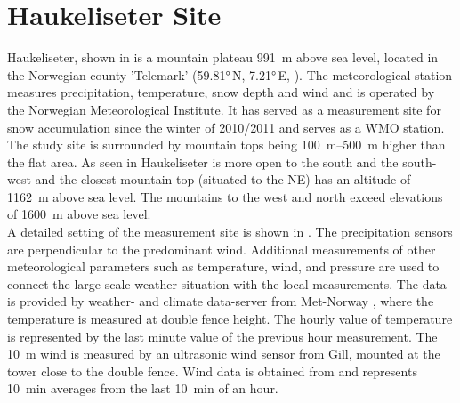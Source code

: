 \section{Haukeliseter Site}\label{sec:dim:site}
Haukeliseter, shown in  is a mountain plateau \SI{991}{\m} above sea level, located in the Norwegian county 'Telemark' (\ang{59.81}\,N, \ang{7.21}\,E, ). The meteorological station measures precipitation, temperature, snow depth and wind and is operated by the Norwegian Meteorological Institute. It has served as a measurement site for snow accumulation since the winter of 2010/2011 \citep{wolff_new_2010} and serves as a WMO station. 
\\

\noindent
The study site is surrounded by mountain tops being \SIrange{100}{500}{\metre} higher than the flat area. As seen in  Haukeliseter is more open to the south and the south-west and the closest mountain top (situated to the NE) has an altitude of \SI{1162}{\metre} above sea level. The mountains to the west and north exceed elevations of \SI{1600}{\metre} above sea level.
\\

\noindent
A detailed setting of the measurement site is shown in . The precipitation sensors are perpendicular to the predominant wind. Additional measurements of other meteorological parameters such as temperature, wind, and pressure are used to connect the large-scale weather situation with the local measurements. The data is provided by weather- and climate data-server from Met-Norway \citep{eklima_norwegian_2016}, where the temperature is measured at double fence height. The hourly value of temperature is represented by the last minute value of the previous hour measurement. The \SI{10}{\metre} wind is measured by an ultrasonic wind sensor from Gill, mounted at the tower close to the double fence. Wind data is obtained from \citet{eklima_norwegian_2016} and represents \SI{10}{\minute} averages from the last \SI{10}{\minute} of an hour.
